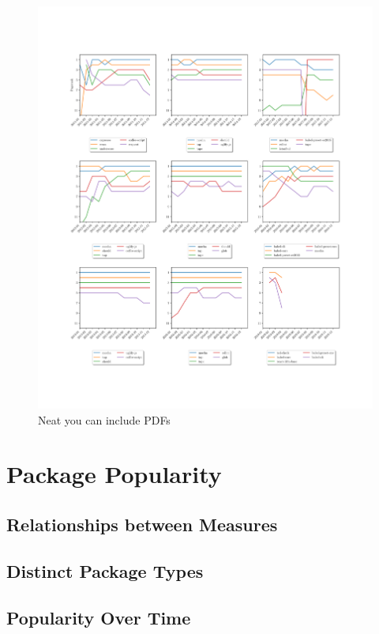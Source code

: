 \documentclass[10pt,conference]{IEEEtran}
\begin{document}
\begin{figure}

  \includegraphics[width=1\textwidth]{figures/highest_ranked_monthly_100.pdf}
  \caption{Neat you can include PDFs}
  \label{ranksByYear}
\end{figure}

\section{Package Popularity}

\subsection{Relationships between Measures}

\subsection{Distinct Package Types}

\subsection{Popularity Over Time}
\end{document}
